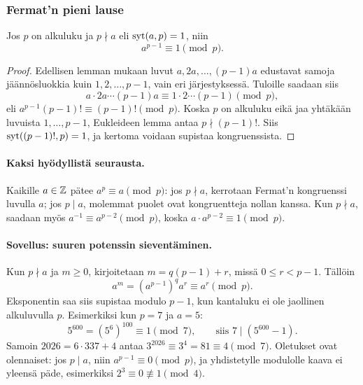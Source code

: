 \documentclass[11pt,a4paper]{amsart}
\begin{document}
\subsubsection{Fermat'n pieni lause}
\begin{theorem}
  Jos $p$ on alkuluku ja $p\nmid a$ eli $\operatorname{syt}(a,p)=1$, niin
  \[
    \boxed{a^{p-1}\equiv1\pmod p.}
  \]
\end{theorem}
\begin{proof}
  Edellisen lemman mukaan luvut $a,2a,\ldots,(p-1)a$ edustavat
  samoja jäännösluokkia kuin $1,2,\ldots,p-1$, vain eri järjestyksessä.
  Tuloille saadaan siis
  \[
    a\cdot2a\cdots(p-1)a\equiv1\cdot2\cdots(p-1)\pmod p,
  \]
  eli $a^{p-1}(p-1)!\equiv(p-1)!\pmod p$.
  Koska $p$ on alkuluku eikä jaa yhtäkään luvuista $1,\ldots,p-1$,
  Eukleideen lemma antaa $p\nmid(p-1)!$. Siis
  $\operatorname{syt}((p-1)!,p)=1$, ja kertoma voidaan supistaa kongruenssista.
\end{proof}

\paragraph{Kaksi hyödyllistä seurausta.}
Kaikille $a\in\mathbb{Z}$ pätee $a^p\equiv a\pmod p$: jos $p\nmid a$,
kerrotaan Fermat'n kongruenssi luvulla $a$; jos $p\mid a$, molemmat
puolet ovat kongruentteja nollan kanssa.
Kun $p\nmid a$, saadaan myös $a^{-1}\equiv a^{p-2}\pmod p$,
koska $a\cdot a^{p-2}\equiv1\pmod p$.

\paragraph{Sovellus: suuren potenssin sieventäminen.}
Kun $p\nmid a$ ja $m\ge0$, kirjoitetaan $m=q(p-1)+r$,
missä $0\le r<p-1$. Tällöin
\[
  a^m=(a^{p-1})^q a^r\equiv a^r\pmod p.
\]
Eksponentin saa siis supistaa modulo $p-1$, kun kantaluku ei ole
jaollinen alkuluvulla $p$. Esimerkiksi kun $p=7$ ja $a=5$:
\[
  5^{600}=(5^6)^{100}\equiv1\pmod7,
  \qquad\text{siis }7\mid(5^{600}-1).
\]
Samoin $2026=6\cdot337+4$ antaa
$3^{2026}\equiv3^4=81\equiv4\pmod7$.
Oletukset ovat olennaiset: jos $p\mid a$, niin
$a^{p-1}\equiv0\pmod p$, ja yhdistetylle modulolle kaava ei
yleensä päde, esimerkiksi $2^3\equiv0\not\equiv1\pmod4$.
\end{document}
